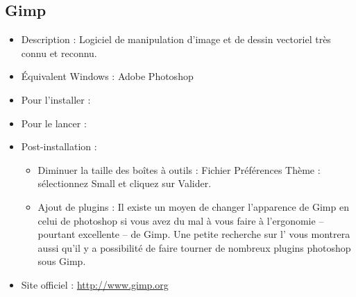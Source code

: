 \subsection{Gimp}
\label{RefInstallGimp}
\begin{itemize}
\begingroup
{}
\item Description : Logiciel de manipulation d'image et de dessin vectoriel très connu et reconnu.{\par}
\item Équivalent Windows : Adobe Photoshop{\par}
\item Pour l'installer : 
\item Pour le lancer : 
\item Post-installation :{\par}
\begin{itemize}
\item Diminuer la taille des boîtes à outils : Fichier \FlecheDroite Préférences \FlecheDroite Thème : sélectionnez Small et cliquez sur Valider.{\par}
\item Ajout de plugins : Il existe un moyen de changer l'apparence de Gimp en celui de photoshop si vous avez du mal à vous faire à l'ergonomie -- pourtant excellente -- de Gimp. Une petite recherche sur l' vous montrera aussi qu'il y a possibilité de faire tourner de nombreux plugins photoshop sous Gimp.{\par}
\endgroup
\end{itemize}
\item Site officiel : \url{http://www.gimp.org}{\par}
\end{itemize}
